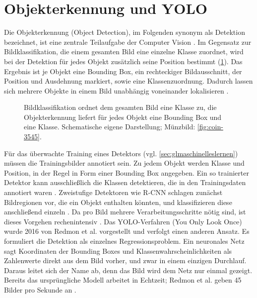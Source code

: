 \section{Objekterkennung und YOLO}
\label{sec:ooyolo}
Die Objekterkennung (Object Detection), im Folgenden synonym als Detektion bezeichnet, ist eine zentrale Teilaufgabe der Computer Vision \cite{redmon2016yolo}. Im Gegensatz zur Bildklassifikation, die einem gesamten Bild eine einzelne Klasse zuordnet, wird bei der Detektion für jedes Objekt zusätzlich seine Position bestimmt (\cref{fig:klassifikation-detektion}). Das Ergebnis ist je Objekt eine Bounding Box, ein rechteckiger Bildausschnitt, der Position und Ausdehnung markiert, sowie eine Klassenzuordnung. Dadurch lassen sich mehrere Objekte in einem Bild unabhängig voneinander lokalisieren \cite{ultralytics-detection}.

\begin{figure}[H]
  \centering
  \resizebox{\linewidth}{!}{}
  \caption[Klassifikation und Objekterkennung]{Bildklassifikation ordnet dem gesamten Bild eine Klasse zu, die Objekterkennung liefert für jedes Objekt eine Bounding Box und eine Klasse. Schematische eigene Darstellung; Münzbild: \cref{fig:coin-3545}.}
  \label{fig:klassifikation-detektion}
\end{figure}

\noindent Für das überwachte Training eines Detektors (vgl. \cref{sec:glmaschinelleslernen}) müssen die Trainingsbilder annotiert sein. Zu jedem Objekt werden Klasse und Position, in der Regel in Form einer Bounding Box angegeben. Ein so trainierter Detektor kann ausschließlich die Klassen detektieren, die in den Trainingsdaten annotiert waren \cite{cheng2024yoloworld}. Zweistufige Detektoren wie R-CNN \cite{girshick2014rich} schlagen zunächst Bildregionen vor, die ein Objekt enthalten könnten, und klassifizieren diese anschließend einzeln \cite{redmon2016yolo,cheng2024yoloworld}. Da pro Bild mehrere Verarbeitungsschritte nötig sind, ist dieses Vorgehen rechenintensiv \cite{redmon2016yolo}. Das YOLO-Verfahren (You Only Look Once) wurde 2016 von Redmon et al. \cite{redmon2016yolo} vorgestellt und verfolgt einen anderen Ansatz. Es formuliert die Detektion als einzelnes Regressionsproblem. Ein neuronales Netz sagt Koordinaten der Bounding Boxes und Klassenwahrscheinlichkeiten als Zahlenwerte direkt aus dem Bild vorher, und zwar in einem einzigen Durchlauf. Daraus leitet sich der Name ab, denn das Bild wird dem Netz nur einmal gezeigt. Bereits das ursprüngliche Modell arbeitet in Echtzeit; Redmon et al. geben 45 Bilder pro Sekunde an \cite{redmon2016yolo}.

